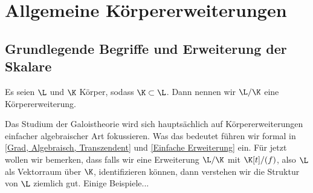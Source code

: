 \documentclass[11pt, a4paper]{article}
\begin{document}
\newpage


\section{Allgemeine Körpererweiterungen}
\subsection{Grundlegende Begriffe und Erweiterung der Skalare}

\begin{definition}[Körpererweiterung] \Theorem
    Es seien $\L$ und $\K$ Körper, sodass $\K\subset \L$. Dann nennen wir $\L/\K$ eine Körpererweiterung.
\end{definition}

\begin{note}
    Das Studium der Galoistheorie wird sich hauptsächlich auf Körpererweiterungen einfacher algebraischer Art fokussieren. Was das bedeutet führen wir formal in \ref{Grad, Algebraisch, Transzendent} und \ref{Einfache Erweiterung} ein. Für jetzt wollen wir bemerken, dass falls wir eine Erweiterung $\L/\K$ mit $\K[t]/(f)$, also $\L$ als Vektorraum über $\K$, identifizieren können, dann verstehen wir die Struktur von $\L$ ziemlich gut. Einige Beispiele...
\end{note}
\end{document}
